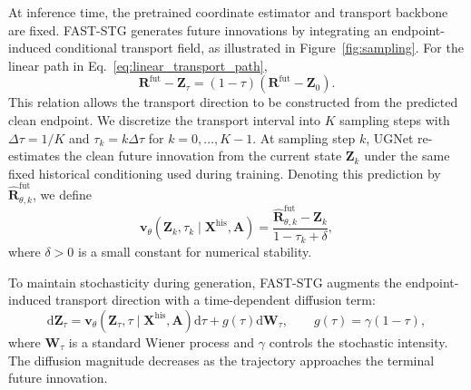 \documentclass[sigconf, anonymous, review]{acmart}
\begin{document}
At inference time, the pretrained coordinate estimator and transport
backbone are fixed. FAST-STG generates future innovations by integrating
an endpoint-induced conditional transport field, as illustrated in
Figure~\ref{fig:sampling}. For the linear path in
Eq.~\eqref{eq:linear_transport_path},
%
\begin{equation}
\mathbf{R}^{\mathrm{fut}}
-
\mathbf{Z}_{\tau}
=
(1-\tau)
\left(
\mathbf{R}^{\mathrm{fut}}
-
\mathbf{Z}_{0}
\right).
\label{eq:endpoint_velocity_relation}
\end{equation}
%
This relation allows the transport direction to be constructed from the
predicted clean endpoint. We discretize the transport interval into
$K$ sampling steps with $\Delta\tau=1/K$ and
$\tau_k=k\Delta\tau$ for $k=0,\ldots,K-1$. At sampling step $k$,
UGNet re-estimates the clean future innovation from the current state
$\mathbf{Z}_{k}$ under the same fixed historical conditioning used
during training. Denoting this prediction by
$\widehat{\mathbf{R}}_{\theta,k}^{\mathrm{fut}}$, we define
%
\begin{equation}
\mathbf{v}_{\theta}
\left(
\mathbf{Z}_{k},\tau_k
\mid
\mathbf{X}^{\mathrm{his}},\mathbf{A}
\right)
=
\frac{
\widehat{\mathbf{R}}_{\theta,k}^{\mathrm{fut}}
-
\mathbf{Z}_{k}
}{
1-\tau_k+\delta
},
\label{eq:transport_velocity}
\end{equation}
%
where $\delta>0$ is a small constant for numerical stability.

To maintain stochasticity during generation, FAST-STG augments the
endpoint-induced transport direction with a time-dependent diffusion
term:
%
\begin{equation}
\mathrm{d}\mathbf{Z}_{\tau}
=
\mathbf{v}_{\theta}
\left(
\mathbf{Z}_{\tau},\tau
\mid
\mathbf{X}^{\mathrm{his}},\mathbf{A}
\right)
\mathrm{d}\tau
+
g(\tau)\mathrm{d}\mathbf{W}_{\tau},
\qquad
g(\tau)=\gamma(1-\tau),
\label{eq:transport_sde}
\end{equation}
%
where $\mathbf{W}_{\tau}$ is a standard Wiener process and $\gamma$
controls the stochastic intensity. The diffusion magnitude decreases
as the trajectory approaches the terminal future innovation.
\end{document}
